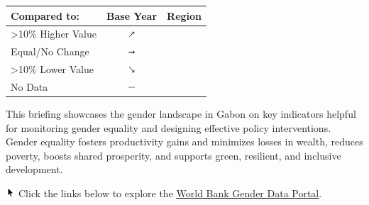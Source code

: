 \documentclass[
]{article}
\author{}
\date{\vspace{-2.5em}}
\begin{document}

\begin{table}\begingroup\fontsize{8}{10}\selectfont

\begin{tabular}[t]{lcl}

\textbf{Compared to:} & \textbf{Base Year} & \textbf{Region}\\
\midrule
>10\% Higher Value & \includegraphics[width=0.1in, height=0.1in]{upicon.png} & \cellcolor[HTML]{21908C}{}\\
Equal/No Change & \includegraphics[width=0.1in, height=0.1in]{righticon.png} & \cellcolor[HTML]{34608D}{}\\
>10\% Lower Value & \includegraphics[width=0.1in, height=0.1in]{downicon.png} & \cellcolor[HTML]{482576}{}\\
No Data & \includegraphics[width=0.1in, height=0.1in]{naicon.png} & \cellcolor{gray}{}\\

\end{tabular}
\endgroup{}\end{table}
\begin{minipage}[t][1.7cm][t]{12cm}
\fontsize{9}{8}\selectfont\raggedright
This briefing showcases the gender landscape in Gabon on key indicators helpful for monitoring gender equality and designing effective policy interventions. Gender equality fosters productivity gains and minimizes losses in wealth, reduces poverty, boosts shared prosperity, and supports green, resilient, and inclusive development. 

\includegraphics[width=10pt]{pointer.png} Click the links below to explore the \underline{\href{https://genderdata.worldbank.org/}{World Bank Gender Data Portal}}.
\end{minipage}
\vspace{8pt}
\end{document}
